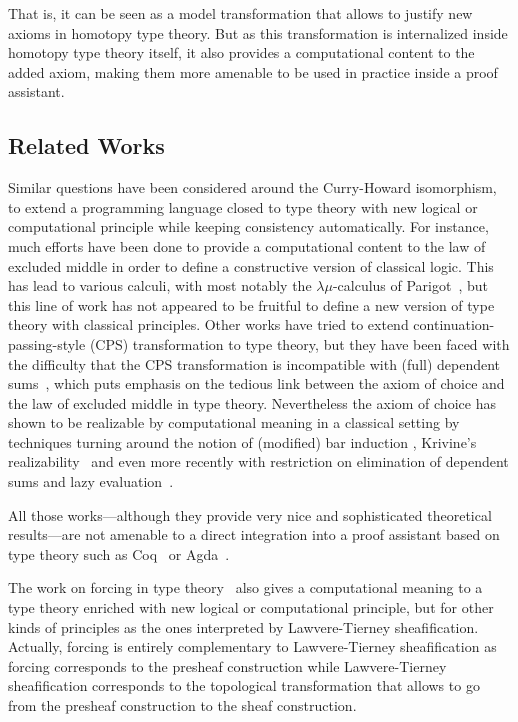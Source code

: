 \documentclass[preprint,9pt,numbers]{sigplanconf}
\begin{document}
That is, it can be seen as a model transformation that
allows to justify new axioms in homotopy type theory. 
%
But as this transformation is internalized inside homotopy type theory
itself, it also provides a computational content to the added axiom,
making them more amenable to be used in practice inside a proof
assistant. 

\subsection{Related Works}
\label{sec:related-works}

Similar questions have been considered around the Curry-Howard
isomorphism, to extend a programming language closed to type theory
with new logical or computational principle while keeping consistency
automatically.
%
For instance, much efforts have been done to provide a computational
content to the law of excluded middle in order to define a
constructive version of classical logic. This has lead to various
calculi, with most notably the $\lambda \mu$-calculus of
Parigot~\cite{parigot1993classical}, but this line of work has not
appeared to be fruitful to define a new version of type theory with
classical principles.
%
Other works have tried to extend continuation-passing-style (CPS)
transformation to type theory, but they have been faced with the
difficulty that the CPS transformation is incompatible with (full) dependent
sums~\cite{barthe2002cps}, which puts emphasis on the tedious link
between the axiom of choice and the law of excluded middle in type theory.
%
Nevertheless the axiom of choice has shown to be realizable by
computational meaning in a classical setting by techniques turning
around the notion of (modified) bar induction
\cite{berardi1998computational}, Krivine's
realizability~\cite{krivine2003dependent} and even more recently with
restriction on elimination of dependent sums and lazy
evaluation~\cite{herbelin2012constructive}.

All those works---although they provide very nice and sophisticated
theoretical results---are not amenable to a direct integration into a
proof assistant based on type theory such as Coq~\cite{coq:refman:8.4}
or Agda~\cite{norell2007towards}.

The work on forcing in type theory~\cite{jaber2012extending} also
gives a computational meaning to a type theory enriched with new
logical or computational principle, but for other kinds of principles
as the ones interpreted by Lawvere-Tierney sheafification.
%
Actually, forcing is entirely complementary to Lawvere-Tierney sheafification as
forcing corresponds to the presheaf construction while
Lawvere-Tierney sheafification corresponds to the topological transformation that
allows to go from the presheaf construction to the sheaf construction.    
\end{document}
